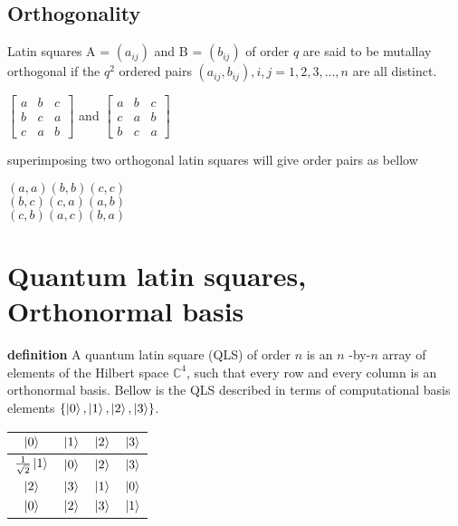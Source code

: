 \documentclass[a4paper, 12pt]{article}
\begin{document}
\subsection{Orthogonality}
Latin squares A = $(a_{ij})$ and B = $(b_{ij})$ of order $q$ are said to be mutallay orthogonal
if the $q^2$ ordered pairs $(a_{ij}, b_{ij}), i,j = 1,2,3,...,n$ are all distinct. 
\begin{center}
\begin{math}
\begin{bmatrix}
  a & b & c\\
  b & c & a\\
  c & a & b
\end{bmatrix}
\end{math}
\noindent and
\begin{math}
\begin{bmatrix}
  a & b & c\\
  c & a & b\\
  b & c & a
\end{bmatrix}
\end{math} \\
\end{center}
superimposing two orthogonal latin squares will give order pairs as bellow
\begin{center}
$(a,a) (b,b) (c,c)$\\ $(b,c) (c,a) (a,b)$\\ $(c,b) (a,c) (b,a)$ \\
\end{center}
\section{Quantum latin squares, Orthonormal basis}
\newcommand{\C}{\mathbb{C}}
\textbf{definition} A quantum latin square (QLS) of order $n$ is an $n$ -by-$n$ array of elements of the
Hilbert space \( \C^4 \), such that every row and every column is an orthonormal basis.
Bellow is the QLS described in terms of computational basis 
elements $\{ \ket{0}, \ket{1}, \ket{2}, \ket{3} \}$.
\begin{center}
\begin{tabular}{||c|c|c|c||}
  \hline
  $\ket{0}$ & $\ket{1}$ & $\ket{2}$ & $\ket{3}$ \\
  \hline
  $\frac{1}{\sqrt{2}}\ket{1}$ & $\ket{0}$ & $\ket{2}$ & $\ket{3}$\\
  \hline
  $\ket{2}$ & $\ket{3}$ & $\ket{1}$ & $\ket{0}$\\
  \hline
  $\ket{0}$ & $\ket{2}$ & $\ket{3}$ & $\ket{1}$\\ 
  \hline
\end{tabular}
\end{center}
\end{document}
